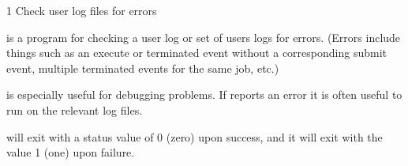 \begin{ManPage}{\label{man-condor-check-userlogs}}{1}
{Check user log files for errors}
\Synopsis {}



\Description

 is a program for checking a user log or
set of users logs for errors.  (Errors include things such as an
execute or terminated event without a corresponding submit event,
multiple terminated events for the same job, etc.)

 is especially useful for debugging
 problems.  If  reports an error
it is often useful to run  on the relevant
log files.

\ExitStatus

 will exit with a status value of 0 (zero)
upon success, and it will exit with the value 1 (one) upon failure.

\end{ManPage}

